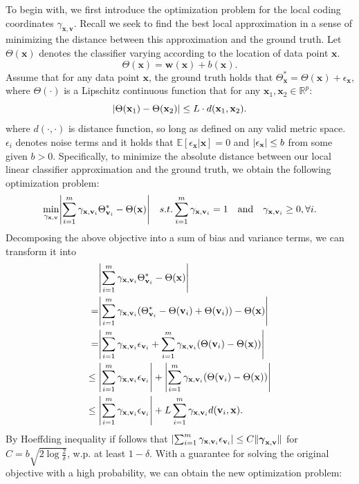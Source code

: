 \documentclass{llncs}
\DeclarePairedDelimiter\abs{\lvert}{\rvert}
\DeclarePairedDelimiter\norm{\lVert}{\rVert}
\def \x {\mathbf{x}}
\def \w {\mathbf{w}}
\def \v {\mathbf{v}}
\begin{document}
	To begin with, we first introduce the optimization problem for the local coding coordinates $\gamma_{\x,\v}$. Recall we seek to find the best local approximation in a sense of minimizing the distance between this approximation and the ground truth. Let $\Theta(\x)$ denotes the classifier varying according to the location of data point $\x$.
	\begin{equation}
	\Theta(\x) = \w(\x) + b(\x).
	\end{equation}
	Assume that for any data point $\x$, the ground truth holds that $\Theta_{\x}^* = \Theta(\x) + \epsilon_{\x}$, where $\Theta(\cdot)$ is a Lipschitz continuous function that for any $\x_1, \x_2 \in \mathbb{R}^p$:
	\begin{equation}
	\abs{\Theta(\x_1)-\Theta(\x_2)} \leq L \cdot d(\x_1,\x_2).
	\end{equation}
	where $d(\cdot,\cdot)$ is distance function, so long as defined on any valid metric space. $\epsilon_i$ denotes noise terms and it holds that $\mathbb{E}[\epsilon_{\x}|\x]=0$ and $\abs{\epsilon_{\x}} \leq b$ from some given $b > 0$. Specifically, to minimize the absolute distance between our local linear classifier approximation and the ground truth, we obtain the following optimization problem:
	\begin{equation}
	\min_{\gamma_{\x,\v}} \abs*{\sum_{i=1}^m\gamma_{\x,\v_i}\Theta_{\v_i}^*- \Theta(\x)} \quad s.t. \sum_{i=1}^m\gamma_{\x,\v_i}=1 \quad \mbox{and} \quad \gamma_{\x,\v_i} \geq 0, \forall i.
	\end{equation} 
	Decomposing the above objective into a sum of bias and variance terms, we can transform it into
	\begin{equation}
	\begin{split}
	&\abs*{\sum_{i=1}^m\gamma_{\x,\v_i}\Theta_{\v_i}^*- \Theta(\x)} \\ {}=&\abs*{\sum_{i=1}^{m}\gamma_{\x,\v_i}(\Theta_{\v_i}^*-\Theta(\v_i)+\Theta(\v_i))-\Theta(\x)} \\
	{}=&\abs*{\sum_{i=1}^m\gamma_{\x,\v_i}\epsilon_{\v_i} + \sum_{i=1}^m\gamma_{\x,\v_i}(\Theta(\v_i)-\Theta(\x))}\\
	\leq{}& \abs*{\sum_{i=1}^m\gamma_{\x,\v_i}\epsilon_{\v_i}} + \abs*{\sum_{i=1}^m\gamma_{\x,\v_i}(\Theta(\v_i)-\Theta(\x))}\\
	\leq{}& \abs*{\sum_{i=1}^m\gamma_{\x,\v_i}\epsilon_{\v_i}} +
	L\sum_{i=1}^{m}\gamma_{\x,\v_i} d(\v_i,\x).
	\end{split}
	\end{equation}
	By Hoeffding inequality if follows that $\abs*{\sum_{i=1}^m\gamma_{\x,\v_i}\epsilon_{\v_i}} \leq C\norm{\boldsymbol{\gamma}_{\x,\v}}$ for $C=b\sqrt{2\log{\frac{2}{\delta}}}$, w.p. at least $1-\delta$. With a guarantee for solving the original objective with a high probability, we can obtain the new optimization problem:
\end{document}
